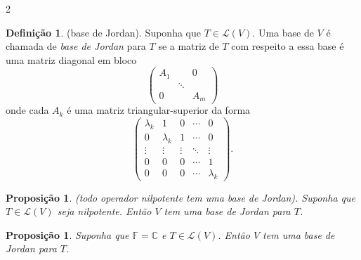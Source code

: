 \documentclass{article}
\theoremstyle{plain}
\newtheorem{prop}[thm]{Proposição}
\theoremstyle{definition}
\newtheorem{defn}{Definição}[section]
\theoremstyle{remark}
\begin{document}
\begin{multicols}{2}
\begin{defn} (base de Jordan).
    Suponha que \(T \in \mathcal{L}(V)\). Uma base de \(V\) é chamada de \emph{base de Jordan} para \(T\) se a matriz de \(T\) com respeito a essa base é uma matriz diagonal em bloco 
    \[
        \begin{pmatrix*}
            A_1 & & 0 \\
            & \ddots & \\
            0 & & A_m
        \end{pmatrix*}
    \]
    \noindent onde cada \(A_k\) é uma matriz triangular-superior da forma 
    \[
        \begin{pmatrix*}
            \lambda_k & 1 & 0 & \cdots & 0 \\
            0 & \lambda_k & 1 & \cdots & 0 \\
            \vdots & \vdots & \vdots & \ddots & \vdots \\
            0 & 0 & 0 & \cdots & 1 \\
            0 & 0 & 0 & \cdots & \lambda_k
        \end{pmatrix*}.
    \]
\end{defn}

\begin{prop} (todo operador nilpotente tem uma base de Jordan).
    Suponha que \(T \in \mathcal{L}(V)\) seja nilpotente. Então \(V\) tem uma base de Jordan para \(T\).
\end{prop}

\begin{prop}
    Suponha que \(\mathbb{F} = \mathbb{C}\) e \(T \in \mathcal{L}(V)\). Então \(V\) tem uma base de Jordan para \(T\).
\end{prop}

\end{multicols}
\end{document}
